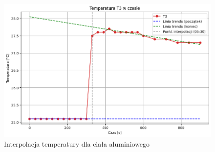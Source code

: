 \documentclass[a4paper,12pt]{article}
\begin{document}
\newpage
\begin{figure}[H]
    \centering
    \includegraphics[width=0.9\textheight,angle=90]{t3_interpolacja.png}
    \caption{Interpolacja temperatury dla ciała aluminiowego}
    \label{fig:t3_interpolacja}
\end{figure}






\end{document}
